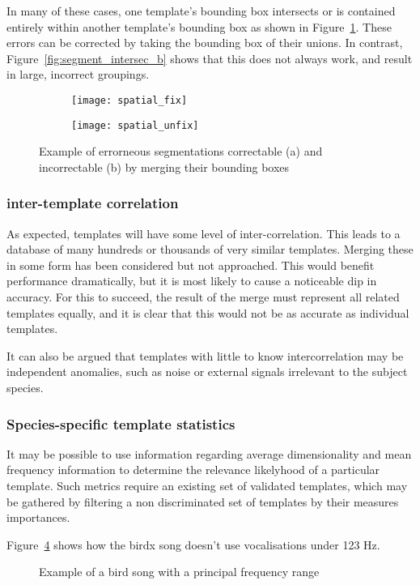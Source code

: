 In many of these cases, one template's bounding box intersects or is contained
entirely within another template's bounding box as shown in
Figure~\ref{fig:segment_intersect_a}.
These errors can be corrected by taking the bounding box of their unions.
In contrast, Figure~\ref{fig:segment_intersec_b} shows that this does not always
work, and result in large, incorrect groupings.

\begin{figure}[!htb]
  \centering
  \begin{subfigure}[h]{0.5\textwidth}
    \centering
    \texttt{[image: spatial\_fix]}
    \caption{}\label{fig:segment_intersect_a}
  \end{subfigure}%
  \begin{subfigure}[h]{0.5\textwidth}
    \centering
    \texttt{[image: spatial\_unfix]}
    \caption{}
    \caption{}\label{fig:segment_intersect_b}
  \end{subfigure}
  \caption{Example of errorneous segmentations correctable (a) and incorrectable (b)
  by merging their bounding boxes}
  \label{fig:segment_intersect}
\end{figure}

\subsubsection{inter-template correlation}
As expected, templates will have some level of inter-correlation.
This leads to a database of many hundreds or thousands of very similar templates.
Merging these in some form has been considered but not approached.
This would benefit performance dramatically, but it is most likely to cause
a noticeable dip in accuracy.
For this to succeed, the result of the merge must represent all related templates
equally, and it is clear that this would not be as accurate as individual
templates.

It can also be argued that templates with little to know intercorrelation may be
independent anomalies, such as noise or external signals irrelevant to the
subject species.

\subsubsection{Species-specific template statistics}
It may be possible to use information regarding average dimensionality and mean
frequency information to determine the relevance likelyhood of a particular template.
Such metrics require an existing set of validated templates, which may be gathered
by filtering a non discriminated set of templates by their measures importances.

Figure~\ref{fig:bandlimit} shows how the birdx song doesn't use vocalisations
under 123 Hz.

\begin{figure}[!htb]
  \centering
  \caption{Example of a bird song with a principal frequency range}
  \label{fig:bandlimit}
\end{figure}
